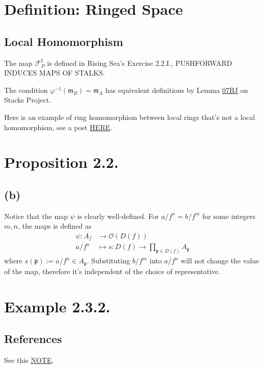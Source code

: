 \section{Definition: Ringed Space}

\subsection{Local Homomorphism}

The map $\mathscr F^{\sharp}_P$ is defined in Rising Sea's Exercise 2.2.I., PUSHFORWARD INDUCES MAPS OF STALKS.

The condition $\varphi^{-1}(\mathfrak m_B)=\mathfrak m_A$ has equivalent definitions by Lemma \href{https://stacks.math.columbia.edu/tag/07BH}{07BJ} on Stacks Project.

Here is an example of ring homomorphism between local rings that's not a local homomorphism, see a post \href{https://math.stackexchange.com/questions/3752503/example-of-non-local-homomorphism-on-local-rings}{HERE}.

\section{Proposition 2.2.}

\subsection{(b)}

Notice that the map $\psi$ is clearly well-defined.
For $a/f^n=b/f^m$ for some integers $m,n$, the maps is defined as 
\begin{align*}
    \psi:A_f &\to \mathcal O(D(f))\\
    a/f^n &\mapsto s: D(f)\to\prod_{\mathfrak p\in D(f)}A_{\mathfrak p}
\end{align*}where $s(\mathfrak p):=a/f^n\in A_{\mathfrak p}$. Substituting $b/f^m$ into $a/f^n$ will not change the value of the map, therefore it's independent of the choice of representative.

\section{Example 2.3.2.}

\subsection{References}
See this \href{https://math.mit.edu/~mckernan/Teaching/09-10/Autumn/18.725/l_11.pdf}{NOTE}.

